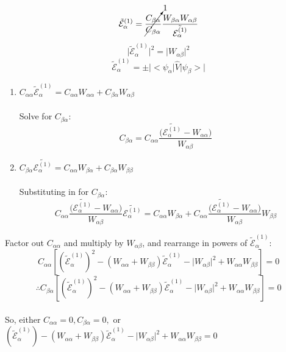 \documentclass[12pt,fancychapters]{report}
\numberwithin{equation}{section}
\begin{document}
\[
  \tilde{\mathcal{E}}_\alpha^{(1)} = \cancelto{1}{\frac{C_{\beta\alpha}}{C_{\beta\alpha}}} 
  \frac{W_{\beta\alpha}W_{\alpha\beta}}{\tilde{\mathcal{E}_\alpha^{(1)}}}
\]
\[
  \big|\tilde{\mathcal{E}}_\alpha^{(1)}\big|^2 = \big|W_{\alpha\beta}\big|^2
\]
\begin{equation*}
  \boxed{\tilde{\mathcal{E}}_\alpha^{(1)} = \pm \big|\big<\psi_\alpha\big|\hat{V}\big|\psi_\beta
  \big>\big|}
\end{equation*}
\begin{enumerate}
  \item $C_{\alpha\alpha}\tilde{\mathcal{E}}_\alpha^{(1)} = C_{\alpha\alpha}W_{\alpha\alpha}+
    C_{\beta\alpha}W_{\alpha\beta}$\\
    \\
    Solve for $C_{\beta\alpha}:$
    \[
      C_{\beta\alpha} = C_{\alpha\alpha}\frac{\big(\tilde{\mathcal{E}_\alpha^{(1)}}-
      W_{\alpha\alpha}\big)}{W_{\alpha\beta}}
    \]
  \item $C_{\beta\alpha}\tilde{\mathcal{E}_\alpha^{(1)}} =C_{\alpha\alpha}W_{\beta\alpha}+ 
    C_{\beta\alpha}W_{\beta\beta}$\\
    \\
    Substituting in for $C_{\beta\alpha}:$
    \[
      C_{\alpha\alpha} \frac{\big(\tilde{\mathcal{E}_\alpha^{(1)}}- W_{\alpha\alpha}\big)}
      {W_{\alpha\beta}}\tilde{\mathcal{E}_\alpha^{(1)}} = C_{\alpha\alpha}W_{\beta\alpha}
      + C_{\alpha\alpha}\frac{\big(\tilde{\mathcal{E}_\alpha^{(1)}}- W_{\alpha\alpha}\big)}
      {W_{\alpha\beta}}W_{\beta\beta}
    \]
\end{enumerate}
Factor out $C_{\alpha\alpha}$ and multiply by $W_{\alpha\beta}$, and rearrange in powers of 
$\tilde{\mathcal{E}}_\alpha^{(1)}$:
\[
  C_{\alpha\alpha}\left[\left(\tilde{\mathcal{E}}_\alpha^{(1)}\right)^2-\left( 
  W_{\alpha\alpha}+W_{\beta\beta}\right)\tilde{\mathcal{E}}_\alpha^{(1)}  - \big|W_{\alpha
\beta}\big|^2+W_{\alpha\alpha}W_{\beta\beta}\right] = 0
\]
\[
  \therefore C_{\beta\alpha}\left[\left(\tilde{\mathcal{E}}_\alpha^{(1)}\right)^2 - 
  \left(W_{\alpha\alpha}+W_{\beta\beta}\right)\tilde{\mathcal{E}}_\alpha^{(1)} - 
\big|W_{\alpha\beta}\big|^2 + W_{\alpha\alpha}W_{\beta\beta}\right]=0
\]\\
So, either $C_{\alpha\alpha} = 0, C_{\beta\alpha} = 0,$ or $\left(\tilde{\mathcal{E}}_\alpha^{(1)}
\right) - \left(W_{\alpha\alpha}+W_{\beta\beta}\right)\tilde{\mathcal{E}}_\alpha^{(1)}
- \big|W_{\alpha\beta}\big|^2 + W_{\alpha\alpha}W_{\beta\beta} = 0$\\
\\
\end{document}
